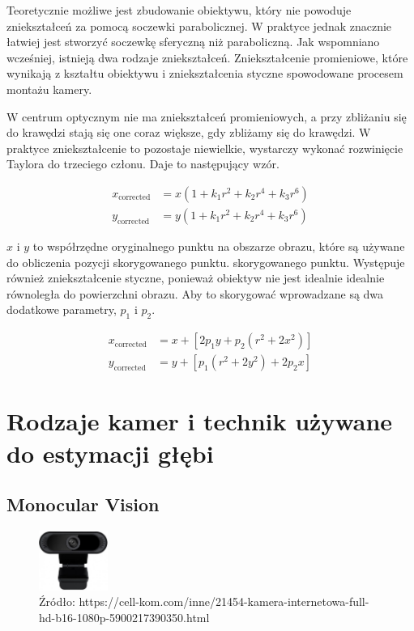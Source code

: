 \documentclass[magisterska]{pracadypl}
\begin{document}
Teoretycznie możliwe jest zbudowanie obiektywu, który nie powoduje zniekształceń za pomocą soczewki parabolicznej.
W praktyce jednak znacznie łatwiej jest stworzyć soczewkę sferyczną niż paraboliczną.
Jak wspomniano wcześniej, istnieją dwa rodzaje zniekształceń. Zniekształcenie
promieniowe, które wynikają z kształtu obiektywu i zniekształcenia styczne spowodowane procesem montażu kamery.

W centrum optycznym nie ma zniekształceń promieniowych, a przy zbliżaniu się do krawędzi stają się one coraz większe, gdy zbliżamy się do krawędzi. W praktyce zniekształcenie to pozostaje niewielkie, wystarczy wykonać rozwinięcie Taylora do trzeciego członu.
Daje to następujący wzór.

\begin{align*}
x_{\text{corrected}} &= x \left(1 + k_1 r^2 + k_2 r^4 + k_3 r^6 \right) \\
y_{\text{corrected}} &= y \left(1 + k_1 r^2 + k_2 r^4 + k_3 r^6 \right)
\end{align*}

$x$ i $y$ to współrzędne oryginalnego punktu na obszarze obrazu, które są używane do obliczenia pozycji skorygowanego punktu.
skorygowanego punktu.
Występuje również zniekształcenie styczne, ponieważ obiektyw nie jest idealnie
idealnie równoległa do powierzchni obrazu. Aby to skorygować
wprowadzane są dwa dodatkowe parametry, $p_1$ i $p_2$.

\begin{align*}
x_{\text{corrected}} &= x + \left[2p_1 y + p_2 (r^2 + 2x^2)\right] \\
y_{\text{corrected}} &= y + \left[p_1 (r^2 + 2y^2) + 2p_2 x\right]
\end{align*}

\section{Rodzaje kamer i technik używane do estymacji głębi}

\subsection{Monocular Vision}

\begin{figure}[h]  %
    \centering  %
    \includegraphics[width=0.2\textwidth]{images/MONO.png}  %
    \captionsetup{labelformat=empty, font=footnotesize}
    \caption{Źródło: https://cell-kom.com/inne/21454-kamera-internetowa-full-hd-b16-1080p-5900217390350.html}
    \label{fig:mono}  %
\end{figure}
\end{document}
